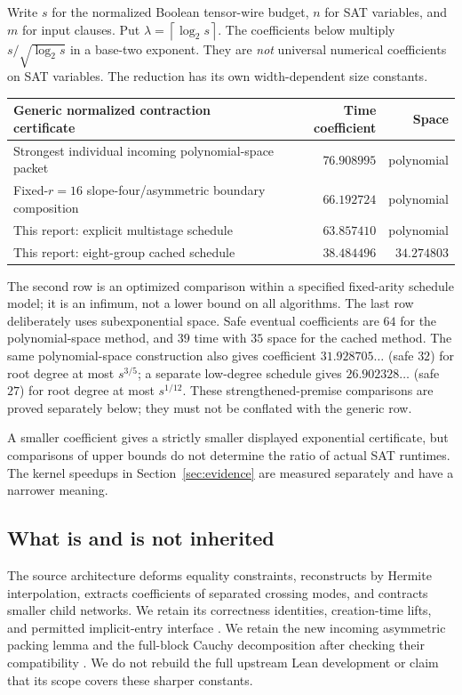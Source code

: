 \documentclass[11pt,letterpaper]{article}
\theoremstyle{definition}\newtheorem{definition}[theorem]{Definition}
\theoremstyle{remark}\newtheorem{remark}[theorem]{Remark}
\newcommand{\ceil}[1]{\left\lceil#1\right\rceil}
\begin{document}
Write $s$ for the normalized Boolean tensor-wire budget, $n$ for SAT
variables, and $m$ for input clauses. Put $\lambda=\ceil{\log_2s}$.
The coefficients below multiply $s/\sqrt{\log_2s}$ in a base-two exponent.
They are \emph{not} universal numerical coefficients on SAT variables.
The reduction has its own width-dependent size constants.

\begin{center}
\begin{tabular}{@{}p{}rr@{}}
\toprule
Generic normalized contraction certificate & Time coefficient & Space\\
\midrule
Strongest individual incoming polynomial-space packet & $76.908995$ & polynomial\\
Fixed-$r=16$ slope-four/asymmetric boundary composition & $66.192724$ & polynomial\\
This report: explicit multistage schedule & $63.857410$ & polynomial\\
This report: eight-group cached schedule & $38.484496$ & $34.274803$\\
\bottomrule
\end{tabular}
\end{center}

The second row is an optimized comparison within a specified fixed-arity
schedule model; it is an infimum, not a lower bound on all algorithms.
The last row deliberately uses subexponential space. Safe eventual
coefficients are $64$ for the polynomial-space method, and $39$ time with
$35$ space for the cached method. The same polynomial-space construction also gives coefficient
$31.928705\ldots$ (safe $32$) for root degree at most $s^{3/5}$;
a separate low-degree schedule gives $26.902328\ldots$ (safe $27$) for
root degree at most $s^{1/12}$. These strengthened-premise comparisons
are proved separately below; they must not be conflated with the generic row.

A smaller coefficient gives a strictly smaller displayed exponential
certificate, but comparisons of upper bounds do not determine the ratio
of actual SAT runtimes. The kernel speedups in Section~\ref{sec:evidence}
are measured separately and have a narrower meaning.

\subsection{What is and is not inherited}

The source architecture deforms equality constraints, reconstructs by
Hermite interpolation, extracts coefficients of separated crossing modes,
and contracts smaller child networks. We retain its correctness identities,
creation-time lifts, and permitted implicit-entry interface
\cite{openai,contraction}. We retain the new incoming asymmetric packing
lemma and the full-block Cauchy decomposition after checking their
compatibility \cite{asymmetric,joint}. We do not rebuild the full upstream
Lean development or claim that its scope covers these sharper constants.
\end{document}
